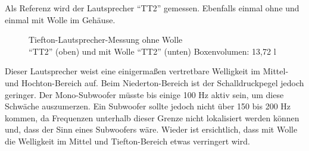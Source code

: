\newpage
Als Referenz wird der Lautsprecher \enquote{TT2} gemessen. 
Ebenfalls einmal ohne und einmal mit Wolle im Gehäuse.
\begin{figure} [H]
	\centering
	\quad
	\caption{Tiefton-Lautsprecher-Messung ohne Wolle\\ \enquote{TT2} (oben) und mit Wolle \enquote{TT2} (unten) Boxenvolumen: 13,72 l}
	\label{fig:4.2.4.2}
\end{figure}
Dieser Lautsprecher weist eine einigermaßen vertretbare Welligkeit im Mittel- und Hochton-Bereich auf.
Beim Niederton-Bereich ist der Schalldruckpegel jedoch geringer.
Der Mono-Subwoofer müsste bis einige 100 Hz aktiv sein, um diese Schwäche auszumerzen.
Ein Subwoofer sollte jedoch nicht über 150 bis 200 Hz kommen, da Frequenzen unterhalb dieser Grenze nicht lokalisiert werden können und, dass der Sinn eines Subwoofers wäre.
Wieder ist ersichtlich, dass mit Wolle die Welligkeit im Mittel und Tiefton-Bereich etwas verringert wird.

